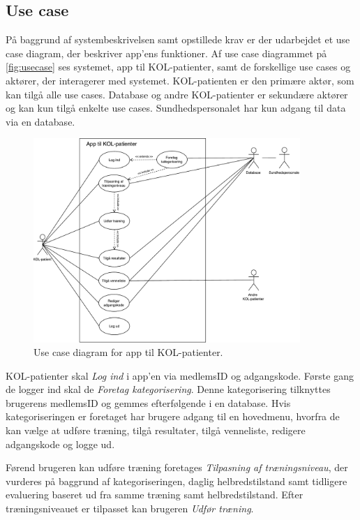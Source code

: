 \subsection{Use case} \label{sec:usecase} 
På baggrund af systembeskrivelsen samt opstillede krav er der udarbejdet et use case diagram, der beskriver app'ens funktioner. Af use case diagrammet på \autoref{fig:usecase} ses systemet, app til KOL-patienter, samt de forskellige use cases og aktører, der interagerer med systemet. KOL-patienten er den primære aktør, som kan tilgå alle use cases.  Database og andre KOL-patienter er sekundære aktører og kan kun tilgå enkelte use cases. Sundhedspersonalet har kun adgang til data via en database. 

\begin{figure} [H]
\centering
\includegraphics[width=0.9\textwidth]{figures/aktivitetsdiagram/Usecase}
\caption{Use case diagram for app til KOL-patienter.}
\label{fig:usecase}
\end{figure}

\noindent
KOL-patienter skal \textit{Log ind} i app'en via medlemsID og adgangskode. Første gang de logger ind skal de \textit{Foretag kategorisering}. Denne kategorisering tilknyttes brugerens medlemsID og gemmes efterfølgende i en database.
Hvis kategoriseringen er foretaget har brugere adgang til en hovedmenu, hvorfra de kan vælge at udføre træning, tilgå resultater, tilgå venneliste, redigere adgangskode og logge ud. 

Førend brugeren kan udføre træning foretages \textit{Tilpasning af træningsniveau}, der vurderes på baggrund af kategoriseringen, daglig helbredstilstand samt tidligere evaluering baseret ud fra samme træning samt helbredstilstand. Efter træningsniveauet er tilpasset kan brugeren \textit{Udfør træning}.

